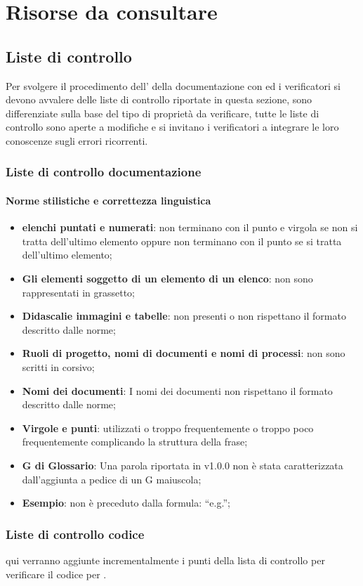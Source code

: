 \section{Risorse da consultare}
    \subsection{Liste di controllo}
        Per svolgere il procedimento dell’  della documentazione con  ed  i verificatori si devono avvalere delle liste di controllo riportate in questa sezione, sono differenziate sulla base del tipo di proprietà da verificare, tutte le liste di controllo sono aperte a modifiche e si invitano i verificatori a integrare le loro conoscenze sugli errori ricorrenti.\\
        \subsubsection{Liste di controllo documentazione}
            \paragraph{Norme stilistiche e correttezza linguistica}
                \begin{itemize}
                    \item\textbf{elenchi puntati e numerati}: non terminano con il punto e virgola se non si tratta dell’ultimo elemento oppure non terminano con il punto se si tratta dell’ultimo elemento;
                    \item\textbf{Gli elementi soggetto di un elemento di un elenco}: non sono rappresentati in grassetto;
                    \item\textbf{Didascalie immagini e tabelle}: non presenti o non rispettano il formato descritto dalle norme;
                    \item\textbf{Ruoli di progetto, nomi di documenti e nomi di processi}: non sono scritti in corsivo;
                    \item\textbf{Nomi dei documenti}: I nomi dei documenti non rispettano il formato descritto dalle norme;
                    \item\textbf{Virgole e punti}: utilizzati o troppo frequentemente o troppo poco frequentemente complicando la struttura della frase;
                    \item\textbf{G di Glossario}: Una parola riportata in  v1.0.0 non è stata caratterizzata dall’aggiunta a pedice di un G maiuscola;
                    \item\textbf{Esempio}: non è preceduto dalla formula: “e.g.”;
                \end{itemize}
                
        \subsubsection{Liste di controllo codice}
            qui verranno aggiunte incrementalmente i punti della lista di controllo per verificare il codice per .
            
